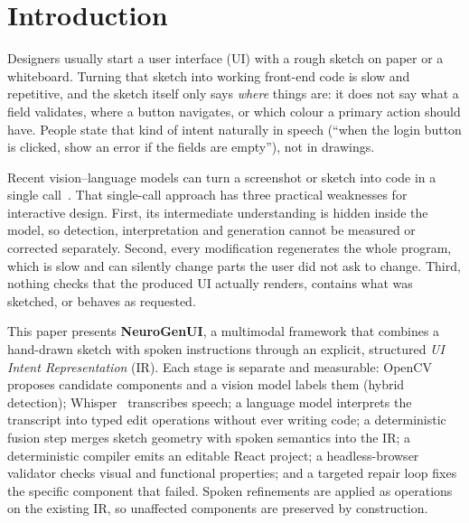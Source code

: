 \section{Introduction}
Designers usually start a user interface (UI) with a rough sketch on paper or a whiteboard. Turning that sketch into working front-end code is slow and repetitive, and the sketch itself only says \emph{where} things are: it does not say what a field validates, where a button navigates, or which colour a primary action should have. People state that kind of intent naturally in speech (``when the login button is clicked, show an error if the fields are empty''), not in drawings.

Recent vision--language models can turn a screenshot or sketch into code in a single call~\cite{si2024design2code}. That single-call approach has three practical weaknesses for interactive design. First, its intermediate understanding is hidden inside the model, so detection, interpretation and generation cannot be measured or corrected separately. Second, every modification regenerates the whole program, which is slow and can silently change parts the user did not ask to change. Third, nothing checks that the produced UI actually renders, contains what was sketched, or behaves as requested.

This paper presents \textbf{NeuroGenUI}, a multimodal framework that combines a hand-drawn sketch with spoken instructions through an explicit, structured \emph{UI Intent Representation} (IR). Each stage is separate and measurable: OpenCV proposes candidate components and a vision model labels them (hybrid detection); Whisper~\cite{radford2023whisper} transcribes speech; a language model interprets the transcript into typed edit operations without ever writing code; a deterministic fusion step merges sketch geometry with spoken semantics into the IR; a deterministic compiler emits an editable React project; a headless-browser validator checks visual and functional properties; and a targeted repair loop fixes the specific component that failed. Spoken refinements are applied as operations on the existing IR, so unaffected components are preserved by construction.

